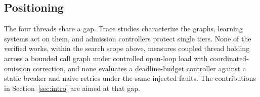 \subsection{Positioning}

The four threads share a gap. Trace studies characterize the graphs, learning systems act on them, and admission controllers protect single tiers. None of the verified works, within the search scope above, measures coupled thread holding across a bounded call graph under controlled open-loop load with coordinated-omission correction, and none evaluates a deadline-budget controller against a static breaker and naive retries under the same injected faults. The contributions in Section~\ref{sec:intro} are aimed at that gap.


